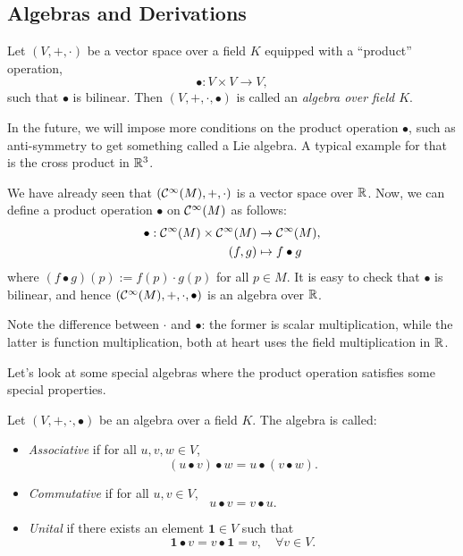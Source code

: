 \subsection{Algebras and Derivations}

\begin{definition}
	Let \((V, +, \cdot)\) be a vector space over a field \(K\) equipped with a ``product'' operation,
	\begin{equation}
		\bullet: V \times V \to V,
	\end{equation}
	such that \(\bullet\) is bilinear. Then \((V, +, \cdot, \bullet)\) is called an \emph{algebra over field \(K\)}.
\end{definition}
In the future, we will impose more conditions on the product operation \(\bullet\), such as anti-symmetry to get something called a Lie algebra. A typical example for that is the cross product in \(\mathbb R^3\).
\begin{example}
	We have already seen that \(\qty(\mathcal C^\infty(M), +, \cdot)\) is a vector space over \(\mathbb R\). Now, we can define a product operation \(\bullet\) on \(\mathcal C^\infty(M)\) as follows:
	\begin{equation}
		\begin{aligned}
			\bullet: \mathcal C^\infty(M) \times \mathcal C^\infty(M) & \to \mathcal C^\infty(M),  \\
			(f, g)                                      & \mapsto f \bullet g
		\end{aligned}
	\end{equation}
	where \((f \bullet g)(p) := f(p) \cdot g(p)\) for all \(p \in M\). It is easy to check that \(\bullet\) is bilinear, and hence \(\qty(\mathcal C^\infty(M), +, \cdot, \bullet)\) is an algebra over \(\mathbb R\).

	Note the difference between \(\cdot\) and \(\bullet\): the former is scalar multiplication, while the latter is function multiplication, both at heart uses the field multiplication in \(\mathbb R\).
\end{example}
Let's look at some special algebras where the product operation satisfies some special properties.
\begin{definition}
	Let \((V, +, \cdot, \bullet)\) be an algebra over a field \(K\). The algebra is called:
	\begin{itemize}
		\item \emph{Associative} if for all \(u, v, w \in V\),
		      \begin{equation}
			      (u \bullet v) \bullet w = u \bullet (v \bullet w).
		      \end{equation}
		\item \emph{Commutative} if for all \(u, v \in V\),
		      \begin{equation}
			      u \bullet v = v \bullet u.
		      \end{equation}
		\item \emph{Unital} if there exists an element \(\mathbf{1} \in V\) such that
		      \begin{equation}
			      \mathbf{1} \bullet v = v \bullet \mathbf{1} = v, \quad \forall v \in V.
		      \end{equation}
	\end{itemize}
\end{definition}
